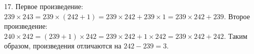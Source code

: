 17. Первое произведение: $239\times243=239\times(242+1)=239\times242+239\times1=239\times242+239.$ Второе произведение: $240\times242=(239+1)\times242=239\times242+1\times242=239\times242+242.$ Таким образом, произведения отличаются на $242-239=3.$\\
